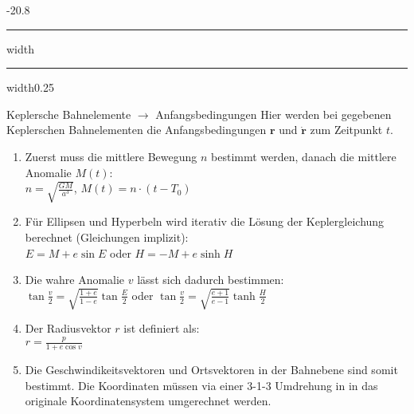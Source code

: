 \documentclass[9pt, landscape, fleqn]{scrartcl}
\makeatletter
\renewcommand{\subsection}{\@startsection{subsection}{1}{0mm}%
{-2\baselineskip}{0.8\baselineskip}%
{\hrule depth 0.2pt width\columnwidth\hrule depth0.75pt
width0.25\columnwidth\vspace*{1.2em}\large\bfseries\rmfamily}}
\makeatother
\begin{document}
\begin{multicols*}{3}
\subsection{Keplersche Bahnelemente $\rightarrow$ Anfangsbedingungen}
Hier werden bei gegebenen Keplerschen Bahnelementen die Anfangsbedingungen $\mathbf{r}$ und $\mathbf{\dot{r}}$ zum Zeitpunkt $t$.
\begin{enumerate}
    \item Zuerst muss die mittlere Bewegung $n$ bestimmt werden, danach die mittlere Anomalie $M(t)$:\\
     $n = \sqrt{\frac{GM}{a^3}}$, $M(t) = n\cdot(t-T_0)$
    \item Für Ellipsen und Hyperbeln wird iterativ die Lösung der Keplergleichung berechnet (Gleichungen implizit): \\
    $E = M + e \sin E$ oder $H=-M +e \sinh H$
    \item Die wahre Anomalie $v$ lässt sich dadurch bestimmen:\\
    $\tan \frac{v}{2} = \sqrt{\frac{1+e}{1-e}}\tan \frac{E}{2}$ oder $\tan \frac{v}{2} = \sqrt{\frac{e+1}{e-1}}\tanh \frac{H}{2}$
    \item Der Radiusvektor $r$ ist definiert als:\\
    $r = \frac{p}{1+e \cos v}$
    \item Die Geschwindikeitsvektoren und Ortsvektoren in der Bahnebene sind somit bestimmt. Die Koordinaten müssen via einer 3-1-3 Umdrehung in in das originale Koordinatensystem umgerechnet werden.
\end{enumerate}

\end{multicols*}
\end{document}
